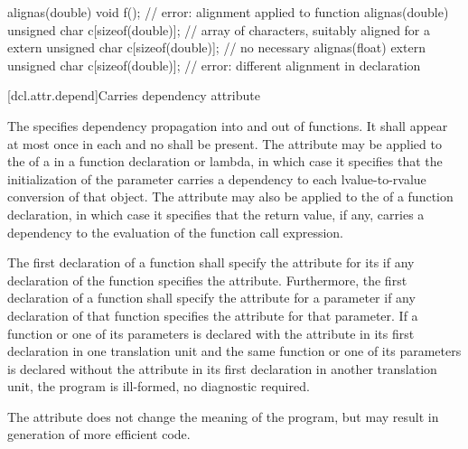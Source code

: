 \pnum
\begin{example}
\begin{codeblock}
alignas(double) void f();                           // error: alignment applied to function
alignas(double) unsigned char c[sizeof(double)];    // array of characters, suitably aligned for a 
extern unsigned char c[sizeof(double)];             // no  necessary
alignas(float)
  extern unsigned char c[sizeof(double)];           // error: different alignment in declaration
\end{codeblock}
\end{example}

[dcl.attr.depend]{Carries dependency attribute}%

\pnum
The   specifies
dependency propagation into and out of functions. It shall appear at most once
in each  and no
 shall be present. The attribute may be
applied to the  of a
 in a function declaration or lambda, in
which case it specifies that the initialization of the parameter carries a
dependency to each lvalue-to-rvalue
conversion of that object. The attribute may also be applied
to the  of a function declaration, in which case it
specifies that the return value, if any, carries a dependency to the evaluation
of the function call expression.

\pnum
The first declaration of a function shall specify the  attribute for its
 if any declaration of the function specifies the
 attribute. Furthermore, the first declaration of a function shall specify
the  attribute for a parameter if any declaration of that function
specifies the  attribute for that parameter. If a function or one of its
parameters is declared with the  attribute in its first declaration in one
translation unit and the same function or one of its parameters is declared without the
 attribute in its first declaration in another translation unit, the
program is ill-formed, no diagnostic required.

\pnum
\begin{note}
The  attribute does not change the meaning of the
program, but may result in generation of more efficient code.
\end{note}


